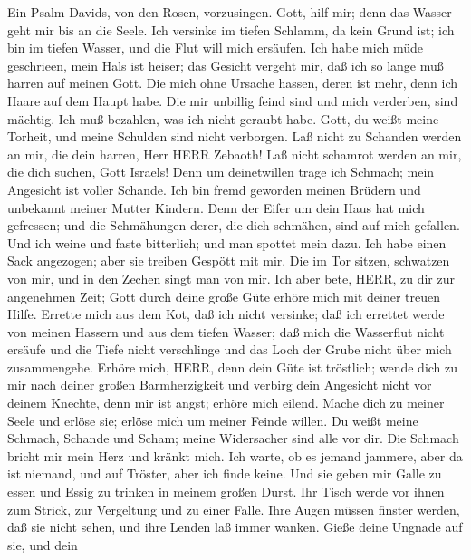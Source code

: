  Ein Psalm Davids, von den Rosen, vorzusingen. Gott, hilf
mir; denn das Wasser geht mir bis an die Seele.  Ich
versinke im tiefen Schlamm, da kein Grund ist; ich bin im tiefen Wasser,
und die Flut will mich ersäufen.  Ich habe mich müde
geschrieen, mein Hals ist heiser; das Gesicht vergeht mir, daß ich so
lange muß harren auf meinen Gott.  Die mich ohne Ursache
hassen, deren ist mehr, denn ich Haare auf dem Haupt habe. Die mir
unbillig feind sind und mich verderben, sind mächtig. Ich muß bezahlen,
was ich nicht geraubt habe.  Gott, du weißt meine Torheit,
und meine Schulden sind nicht verborgen.  Laß nicht zu
Schanden werden an mir, die dein harren, Herr HERR Zebaoth! Laß nicht
schamrot werden an mir, die dich suchen, Gott Israels!  Denn
um deinetwillen trage ich Schmach; mein Angesicht ist voller Schande.
 Ich bin fremd geworden meinen Brüdern und unbekannt meiner
Mutter Kindern.  Denn der Eifer um dein Haus hat mich
gefressen; und die Schmähungen derer, die dich schmähen, sind auf mich
gefallen.  Und ich weine und faste bitterlich; und man
spottet mein dazu.  Ich habe einen Sack angezogen; aber sie
treiben Gespött mit mir.  Die im Tor sitzen, schwatzen von
mir, und in den Zechen singt man von mir.  Ich aber bete,
HERR, zu dir zur angenehmen Zeit; Gott durch deine große Güte erhöre
mich mit deiner treuen Hilfe.  Errette mich aus dem Kot,
daß ich nicht versinke; daß ich errettet werde von meinen Hassern und
aus dem tiefen Wasser;  daß mich die Wasserflut nicht
ersäufe und die Tiefe nicht verschlinge und das Loch der Grube nicht
über mich zusammengehe.  Erhöre mich, HERR, denn dein Güte
ist tröstlich; wende dich zu mir nach deiner großen Barmherzigkeit
 und verbirg dein Angesicht nicht vor deinem Knechte, denn
mir ist angst; erhöre mich eilend.  Mache dich zu meiner
Seele und erlöse sie; erlöse mich um meiner Feinde willen. 
Du weißt meine Schmach, Schande und Scham; meine Widersacher sind alle
vor dir.  Die Schmach bricht mir mein Herz und kränkt mich.
Ich warte, ob es jemand jammere, aber da ist niemand, und auf Tröster,
aber ich finde keine.  Und sie geben mir Galle zu essen und
Essig zu trinken in meinem großen Durst.  Ihr Tisch werde
vor ihnen zum Strick, zur Vergeltung und zu einer Falle. 
Ihre Augen müssen finster werden, daß sie nicht sehen, und ihre Lenden
laß immer wanken.  Gieße deine Ungnade auf sie, und dein
